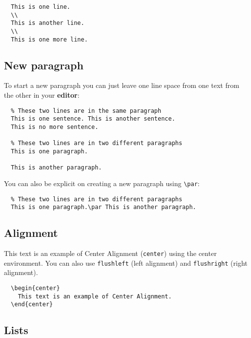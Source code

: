 \begin{lstlisting}
  This is one line.
  \\
  This is another line.
  \\
  This is one more line.
\end{lstlisting}

\subsection{New paragraph}

To start a new paragraph you can just leave one line space from one text from the other in your \textbf{editor}:

\begin{lstlisting}
  % These two lines are in the same paragraph
  This is one sentence. This is another sentence.
  This is no more sentence.

  % These two lines are in two different paragraphs
  This is one paragraph.

  This is another paragraph.
\end{lstlisting}

\bigskip

You can also be explicit on creating a new paragraph using \verb|\par|:

\begin{lstlisting}
  % These two lines are in two different paragraphs
  This is one paragraph.\par This is another paragraph.
\end{lstlisting}

\subsection{Alignment}

\begin{center}
  This text is an example of Center Alignment (\verb|center|) using the center environment. You can also use \verb|flushleft| (left alignment) and \verb|flushright| (right alignment).
\end{center}

\begin{lstlisting}
  \begin{center}
    This text is an example of Center Alignment.
  \end{center}
\end{lstlisting}

\subsection{Lists}


